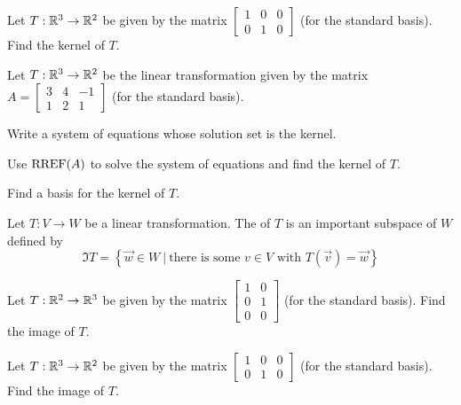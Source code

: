 \begin{applicationActivities}{2}{18}
\begin{activity}{5}
Let $T: \mathbb{R}^3 \rightarrow \mathbb{R}^2$ be given by the matrix $\begin{bmatrix} 1 & 0 &0  \\ 0 & 1 & 0 \end{bmatrix}$ (for the standard basis).  Find the kernel of $T$.
\end{activity}



\begin{activity}{10}
Let $T: \mathbb{R}^3 \rightarrow \mathbb{R}^2$ be the linear transformation given by the matrix $A=\begin{bmatrix} 3 & 4 & -1 \\ 1 & 2 & 1 \end{bmatrix}$ (for the standard basis).
\begin{subactivity}
Write a system of equations whose solution set is the kernel.
\end{subactivity}
\begin{subactivity}
Use $\operatorname{RREF}(A)$ to solve the system of equations and find the kernel of \(T\).
\end{subactivity}
\begin{subactivity}
Find a basis for the kernel of $T$.
\end{subactivity}
\end{activity}


\begin{definition}
Let $T: V \rightarrow W$ be a linear transformation.
The  of $T$ is an important subspace of \(W\) defined by
\[
\Im T = \left\{ \vec{w} \in W\ \big|\ \text{there is some }v\in V \text{ with } T(\vec{v})=\vec{w}\right\}
\]
\end{definition}

\begin{activity}{5}
Let $T: \mathbb{R}^2 \rightarrow \mathbb{R}^3$ be given by the matrix $\begin{bmatrix} 1 & 0 \\ 0 & 1 \\ 0 & 0 \end{bmatrix}$ (for the standard basis).  Find the image of $T$.
\end{activity}

\begin{activity}{5}
Let $T: \mathbb{R}^3 \rightarrow \mathbb{R}^2$ be given by the matrix $\begin{bmatrix} 1 & 0 &0  \\ 0 & 1 & 0 \end{bmatrix}$ (for the standard basis).  Find the image of $T$.
\end{activity}



\end{applicationActivities}
